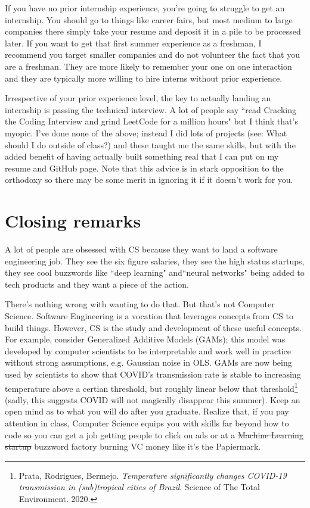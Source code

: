 \documentclass{article}
\begin{document}
If you have no prior internship experience, you're going to struggle to get an internship. You should go to things like career fairs, but most medium to large companies there simply take your resume and deposit it in a pile to be processed later. If you want to get that first summer experience as a freshman, I recommend you target smaller companies and do not volunteer the fact that you are a freshman. They are more likely to remember your one on one interaction and they are typically more willing to hire interns without prior experience.

Irrespective of your prior experience level, the key to actually landing an internship is passing the technical interview. A lot of people say ``read Cracking the Coding Interview and grind LeetCode for a million hours" but I think that's myopic. I've done none of the above; instead I did lots of projects (see: What should I do outside of class?) and these taught me the same skills, but with the added benefit of having actually built something real that I can put on my resume and GitHub page. Note that this advice is in stark opposition to the orthodoxy so there may be some merit in ignoring it if it doesn't work for you.

\section{Closing remarks}
A lot of people are obsessed with CS because they want to land a software engineering job. They see the six figure salaries, they see the high status startups, they see cool buzzwords like ``deep learning" and``neural networks" being added to tech products and they want a piece of the action.

There's nothing wrong with wanting to do that. But that's not Computer Science. Software Engineering is a vocation that leverages concepts from CS to build things. However, CS is the study and development of these useful concepts. For example, consider Generalized Additive Models (GAMs); this model was developed by computer scientists to be interpretable and work well in practice without strong assumptions, e.g. Gaussian noise in OLS. GAMs are now being used by scientists to show that COVID's transmission rate is stable to increasing temperature above a certian threshold, but roughly linear below that threshold\footnote{Prata, Rodrigues, Bermejo. \textit{Temperature significantly changes COVID-19 transmission in (sub)tropical cities of Brazil}. Science of The Total Environment. 2020.} (sadly, this suggests COVID will not magically disappear this summer). Keep an open mind as to what you will do after you graduate. Realize that, if you pay attention in class, Computer Science equips you with skills far beyond how to code so you can get a job getting people to click on ads or at a \sout{Machine Learning startup} buzzword factory burning VC money like it's the Papiermark.
\end{document}
